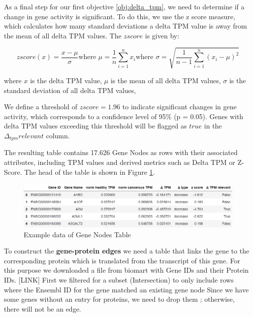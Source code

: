 As a final step for our first objective \ref{obj:delta_tpm}, we need to determine if a change in gene activity is significant. %
To do this, we use the z score measure, which calculates how many standard deviations a delta TPM value is away
from the mean of all delta TPM values.
The $z score$ is given by:

\begin{subequations}
\begin{equation} \label{eq:z_score}
z score (x) = \frac{x - {\mu}}{\sigma}
\end{equation}
\begin{equation}
\text{where } \mu = \frac{1}{n} \sum_{i=1}^{n} x_i
\end{equation}
\begin{equation}
\text{where } \sigma = \sqrt{\frac{1}{n-1} \sum_{i=1}^{n} (x_i - \mu)^2}
\end{equation}
\end{subequations}

where $x$ is the delta TPM value, $\mu$ is the mean of all delta TPM values, $\sigma$ is the standard deviation of all delta TPM values,

We define a threshold of  $z score = 1.96$ to indicate significant changes in gene activity,
which corresponds to a confidence level of 95\% (p = 0.05).
Genes with delta TPM values exceeding this threshold will be flagged as $true$ in the $\Delta_{tpm} relevant$ column.

The resulting table contains 17.626 Gene Nodes as rows with their associated attributes,
including TPM values and derived metrics such as Delta TPM or Z-Score.
The head of the table is shown in Figure \ref{fig:03_02_gene_nodes}.

\begin{figure}[h]
\centering
\includegraphics[scale=0.5]{figures/03_02_gene_nodes}
\caption{Example data of Gene Nodes Table}
\label{fig:03_02_gene_nodes}
\end{figure}


To construct the \textbf{gene-protein edges} we need a table that links the gene to the corresponding protein
which is translated from the transcript of this gene.
For this purpose we downloaded a file from biomart with Gene IDs and their Protein IDs. [LINK]
First we filtered for a subset (Intersection) to only include rows where the Ensembl ID for the gene matched an existing gene node
Since we have some genes without an entry for proteins, we need to drop them ; otherwise, there will not be an edge.

